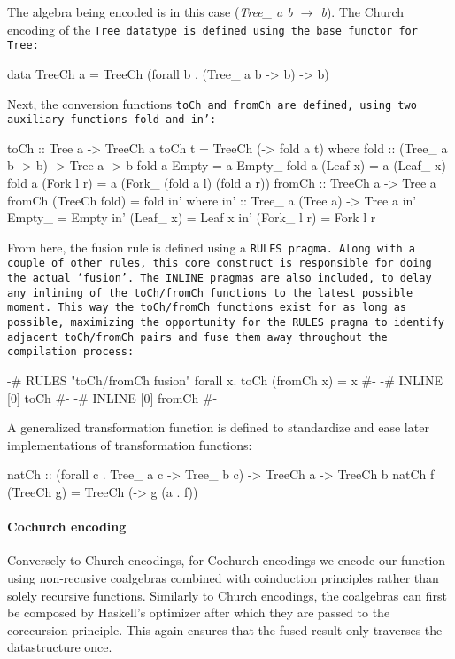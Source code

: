 The algebra being encoded is in this case (\textit{Tree\_ a b $\to$ b}).
The Church encoding of the \tt{Tree} datatype is defined using the base functor for \tt{Tree}:
\begin{code}
data TreeCh a = TreeCh (forall b . (Tree_ a b -> b) -> b)
\end{code}
Next, the conversion functions \tt{toCh} and \tt{fromCh} are defined, using two auxiliary functions \tt{fold} and \tt{in'}:
\begin{code}
toCh :: Tree a -> TreeCh a
toCh t = TreeCh (\a -> fold a t)
  where fold :: (Tree_ a b -> b) -> Tree a -> b
        fold a Empty      = a Empty_
        fold a (Leaf x)   = a (Leaf_ x)
        fold a (Fork l r) = a (Fork_ (fold a l)
                             (fold a r))
fromCh :: TreeCh a -> Tree a
fromCh (TreeCh fold) = fold in'
  where in' :: Tree_ a (Tree a) -> Tree a
        in' Empty_ = Empty
        in' (Leaf_ x) = Leaf x
        in' (Fork_ l r) = Fork l r
\end{code}
From here, the fusion rule is defined using a \tt{RULES} pragma. Along with a couple of other rules, this core construct is responsible for doing the actual `fusion'.
The \tt{INLINE} pragmas are also included, to delay any inlining of the \tt{toCh/fromCh} functions to the latest possible moment.
This way the \tt{toCh/fromCh} functions exist for as long as possible, maximizing the opportunity for the \tt{RULES} pragma to identify adjacent \tt{toCh/fromCh} pairs and fuse them away throughout the compilation process:
\begin{code}
{-# RULES "toCh/fromCh fusion" forall x. toCh (fromCh x) = x #-}
{-# INLINE [0] toCh #-}
{-# INLINE [0] fromCh #-}
\end{code}
A generalized transformation function is defined to standardize and ease later implementations of transformation functions:
\begin{code}
natCh :: (forall c . Tree_ a c -> Tree_ b c) -> TreeCh a -> TreeCh b
natCh f (TreeCh g) = TreeCh (\a -> g (a . f))
\end{code}
\paragraph{Cochurch encoding} Conversely to Church encodings, for Cochurch encodings we encode our function using non-recusive coalgebras combined with coinduction principles rather than solely recursive functions.
Similarly to Church encodings, the coalgebras can first be composed by Haskell's optimizer after which they are passed to the corecursion principle.
This again ensures that the fused result only traverses the datastructure once.

